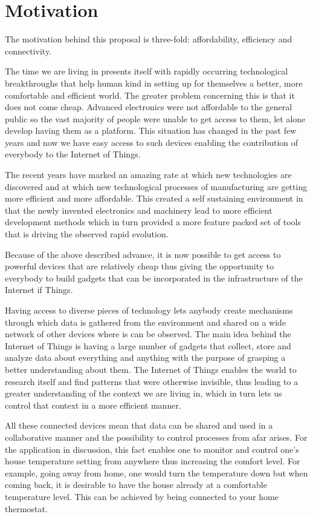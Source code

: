 \chapter*{Motivation}

The motivation behind this proposal is three-fold: affordability, efficiency and connectivity.

The time we are living in presents itself with rapidly occurring technological breakthroughs that help human
kind in setting up for themselves a better, more comfortable and efficient world. The greater problem concerning
this is that it does not come cheap. Advanced electronics were not affordable to the general public so the vast
majority of people were unable to get access to them, let alone develop  having them as a platform. This
situation has changed in the past few years and now we have easy access to such devices enabling the
contribution of everybody to the Internet of Things.

The recent years have marked an amazing rate at which new technologies are discovered and at which new
technological processes of manufacturing are getting more efficient and more affordable. This created a self
sustaining environment in that the newly invented electronics and machinery lead to more efficient
development methods which in turn provided a more feature packed set of tools that is driving the observed
rapid evolution.

Because of the above described advance, it is now possible to get access to powerful devices that are
relatively cheap thus giving the opportunity to everybody to build gadgets that can be incorporated
in the infrastructure of the Internet if Things.

Having access to diverse pieces of technology lets anybody create mechanisms through which data is gathered
from the environment and shared on a wide network of other devices where is can be observed.
The main idea behind the Internet of Things is having a large number of gadgets that collect, store and
analyze data about everything and anything with the purpose of grasping a better understanding about them.
The Internet of Things enables the world to research itself and find patterns that were otherwise invisible,
thus leading to a greater understanding of the context we are living in, which in turn lets us control that
context in a more efficient manner.

All these connected devices mean that data can be shared and used in a collaborative manner and the
possibility to control processes from afar arises. For the application in discussion, this fact enables one to
monitor and control one's house temperature setting from anywhere thus increasing the comfort level. For
example, going away from home, one would turn the temperature down but when coming back, it is desirable to
have the house already at a comfortable temperature level. This can be achieved by being connected to your
home thermostat.
